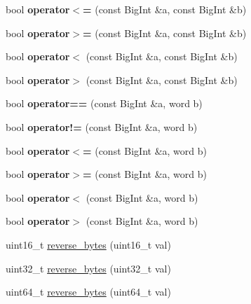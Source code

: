 \begin{DoxyCompactItemize}
bool {\bfseries operator$<$=} (const Big\+Int \&a, const Big\+Int \&b)
\item 
\mbox{\label{namespace_botan_a4cdc148618d75af7f7dffb989bbc5ed7}} 
bool {\bfseries operator$>$=} (const Big\+Int \&a, const Big\+Int \&b)
\item 
\mbox{\label{namespace_botan_a661756a0681456da17b09d32d0f66a9e}} 
bool {\bfseries operator$<$} (const Big\+Int \&a, const Big\+Int \&b)
\item 
\mbox{\label{namespace_botan_af2298f10cbf9e9d22db9fe7a3f8fb062}} 
bool {\bfseries operator$>$} (const Big\+Int \&a, const Big\+Int \&b)
\item 
\mbox{\label{namespace_botan_a1b1f005950763c0ae5f7f4a16f8c638f}} 
bool {\bfseries operator==} (const Big\+Int \&a, word b)
\item 
\mbox{\label{namespace_botan_a93c510e40758e809adbfe81e6ccbae84}} 
bool {\bfseries operator!=} (const Big\+Int \&a, word b)
\item 
\mbox{\label{namespace_botan_aae5f6ab5fd90bdaf8872135205bee956}} 
bool {\bfseries operator$<$=} (const Big\+Int \&a, word b)
\item 
\mbox{\label{namespace_botan_a7d3cb7aa80d65613274b6ecaa5136951}} 
bool {\bfseries operator$>$=} (const Big\+Int \&a, word b)
\item 
\mbox{\label{namespace_botan_a3b1ec8a493a84e4b8a0cc9c3c6090a6c}} 
bool {\bfseries operator$<$} (const Big\+Int \&a, word b)
\item 
\mbox{\label{namespace_botan_aef792f3bade66468fe384572286f983d}} 
bool {\bfseries operator$>$} (const Big\+Int \&a, word b)
\item 
uint16\+\_\+t \hyperlink{namespace_botan_a124bfd8e6621e1ad0d19d902ce10f149}{reverse\+\_\+bytes} (uint16\+\_\+t val)
\item 
uint32\+\_\+t \hyperlink{namespace_botan_a5c0e57eb245139c321b18d1d242c9e9f}{reverse\+\_\+bytes} (uint32\+\_\+t val)
\item 
uint64\+\_\+t \hyperlink{namespace_botan_ae04de07006f5cfa825328813ea7d3985}{reverse\+\_\+bytes} (uint64\+\_\+t val)

\end{DoxyCompactItemize}
